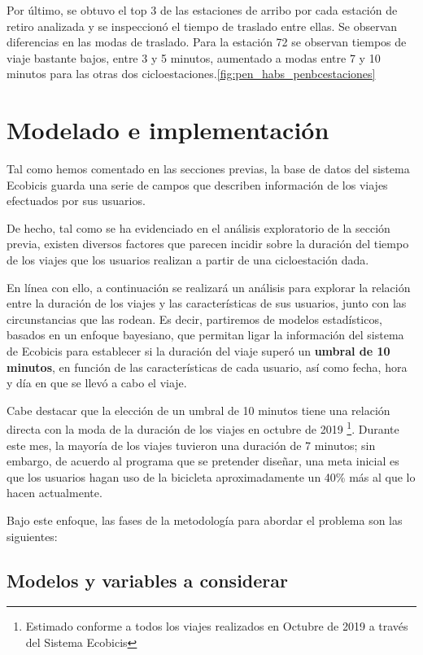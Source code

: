 \documentclass[9pt,twocolumn,twoside]{ilcss}
\begin{document}
Por último, se obtuvo el top 3 de las estaciones de arribo por cada estación de retiro analizada y se inspeccionó el tiempo de traslado entre ellas. Se observan diferencias en las modas de traslado. Para la estación 72 se observan tiempos de viaje bastante bajos, entre 3 y 5 minutos, aumentado a modas entre 7 y 10 minutos para las otras dos cicloestaciones.\ref{fig:pen_habs_penbcestaciones}

\section{Modelado e implementación}

Tal como hemos comentado en las secciones previas, la base de datos del sistema Ecobicis guarda una serie de campos que describen información de los viajes efectuados por sus usuarios. 

De hecho, tal como se ha evidenciado en el análisis exploratorio de la sección previa, existen diversos factores que parecen incidir sobre la duración del tiempo de los viajes que los usuarios realizan a partir de una cicloestación dada. 

En línea con ello, a continuación se realizará un análisis para explorar la relación entre la duración de los viajes y las características de sus usuarios, junto con las circunstancias que las rodean. Es decir, partiremos de modelos estadísticos, basados en un enfoque bayesiano, que permitan ligar la información del sistema de Ecobicis para establecer si la duración del viaje superó un \textbf{umbral de 10 minutos}, en función de las características de cada usuario, así como fecha, hora y día en que se llevó a cabo el viaje.

Cabe destacar que la elección de un umbral de 10 minutos tiene una relación directa con la moda de la duración de los viajes en octubre de 2019 \footnote{Estimado conforme a todos los viajes realizados en Octubre de 2019 a través del Sistema Ecobicis}. Durante este mes, la mayoría de los viajes tuvieron una duración de 7 minutos; sin embargo, de acuerdo al programa que se pretender diseñar, una meta inicial es que los usuarios hagan uso de la bicicleta aproximadamente un 40\% más al que lo hacen actualmente.  

Bajo este enfoque, las fases de la metodología para abordar el problema son las siguientes:

\subsection{Modelos y variables a considerar}
\end{document}
